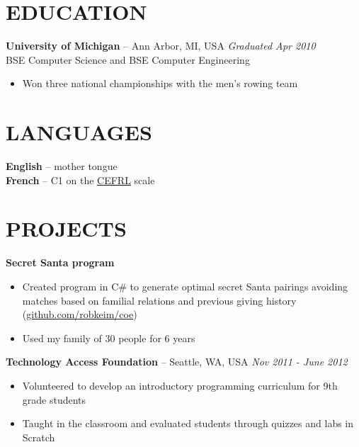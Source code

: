 \documentclass[]{rob-keim-resume}
\begin{document}
\section{EDUCATION} 

{\bf University of Michigan} -- Ann Arbor, MI, USA \hfill {\sl Graduated Apr 2010} \\
BSE Computer Science and BSE Computer Engineering
\begin{itemize} \itemsep -2pt
\item Won three national championships with the men's rowing team
\end{itemize}

\section{LANGUAGES}

{\bf English} -- mother tongue \\
{\bf French} -- C1 on the \href{https://en.wikipedia.org/wiki/Common_European_Framework_of_Reference_for_Languages}{CEFRL} scale

\section{PROJECTS}

{\bf Secret Santa program}
\begin{itemize} \itemsep -2pt
	\item Created program in C\# to generate optimal secret Santa pairings avoiding matches based on familial relations and previous giving history (\href{https://github.com/robkeim/coe}{github.com/robkeim/coe})
	\item Used my family of 30 people for 6 years
\end{itemize}

{\bf Technology Access Foundation} --  Seattle, WA, USA \hfill {\sl Nov 2011 - June 2012} 
\begin{itemize} \itemsep -2pt
	\item Volunteered to develop an introductory programming curriculum for 9th grade students
	\item Taught in the classroom and evaluated students through quizzes and labs in Scratch
\end{itemize}


\end{document}
